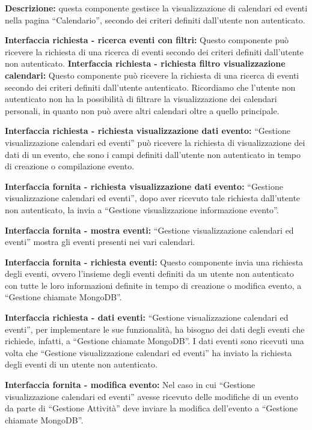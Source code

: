 \begin{listaPersonale}[DCI]{}

    \textbf{Descrizione:} questa componente gestisce la visualizzazione di calendari ed eventi nella pagina “Calendario”, secondo dei criteri definiti dall'utente non autenticato.

    \textbf{Interfaccia richiesta - ricerca eventi con filtri:} Questo componente può ricevere la richiesta di una ricerca di eventi secondo dei criteri definiti dall'utente non autenticato.
    \textbf{Interfaccia richiesta - richiesta filtro visualizzazione
        calendari:}  Questo componente può ricevere la richiesta di una ricerca di eventi secondo dei criteri definiti dall'utente autenticato. Ricordiamo che l'utente non autenticato non ha la possibilità di filtrare la visualizzazione dei calendari personali, in quanto non può avere altri calendari oltre a quello principale.

    \textbf{Interfaccia richiesta - richiesta visualizzazione dati evento:} “Gestione visualizzazione calendari ed eventi” può ricevere la richiesta di visualizzazione dei dati di un evento, che sono i campi definiti dall'utente non autenticato in tempo di creazione o compilazione evento.

    \textbf{Interfaccia fornita - richiesta visualizzazione dati evento:}  “Gestione visualizzazione calendari ed eventi”, dopo aver ricevuto tale richiesta dall'utente non autenticato, la invia a “Gestione visualizzazione informazione evento”.

    \textbf{Interfaccia fornita - mostra eventi:} “Gestione visualizzazione calendari ed eventi” mostra gli eventi presenti nei vari calendari.

    \textbf{Interfaccia fornita - richiesta eventi:} Questo componente invia una richiesta degli eventi, ovvero l'insieme degli eventi definiti da un utente non autenticato con tutte le loro informazioni definite in tempo di creazione o modifica evento, a “Gestione chiamate MongoDB”.

    \textbf{Interfaccia richiesta - dati eventi:} “Gestione visualizzazione calendari ed eventi”, per implementare le sue funzionalità, ha bisogno dei dati degli eventi che richiede, infatti, a “Gestione chiamate MongoDB”. I dati eventi sono ricevuti una volta che “Gestione visualizzazione calendari ed eventi” ha inviato la richiesta degli eventi di un utente non autenticato.

    \textbf{Interfaccia fornita - modifica evento:} Nel caso in cui “Gestione visualizzazione calendari ed eventi” avesse ricevuto delle modifiche di un evento da parte di “Gestione Attività” deve inviare la modifica dell'evento a “Gestione chiamate MongoDB”.


\end{listaPersonale}

